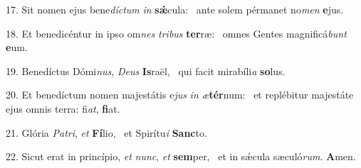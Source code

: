 17. Sit nomen ejus bene\textit{díc}\textit{tum} \textit{in} \textbf{sǽ}cula: \ast\  ante solem pérmanet no\textit{men} \textbf{e}jus.\

18. Et benedicéntur in ipso om\textit{nes} \textit{tri}\textit{bus} \textbf{ter}ræ: \ast\  omnes Gentes magnificá\textit{bunt} \textbf{e}um.\

19. Benedíctus Dómi\textit{nus}, \textit{De}\textit{us} \textbf{Is}raël, \ast\  qui facit mirabíli\textit{a} \textbf{so}lus.\

20. Et benedíctum nomen majestátis e\textit{jus} \textit{in} \textit{æ}\textbf{tér}num: \ast\  et replébitur majestáte ejus omnis terra: fi\textit{at}, \textbf{fi}at.\

21. Glória \textit{Pa}\textit{tri}, \textit{et} \textbf{Fí}lio, \ast\  et Spirítu\textit{i} \textbf{Sanc}to.\

22. Sicut erat in princípio, \textit{et} \textit{nunc}, \textit{et} \textbf{sem}per, \ast\  et in sǽcula sæculó\textit{rum}. \textbf{A}men.\


